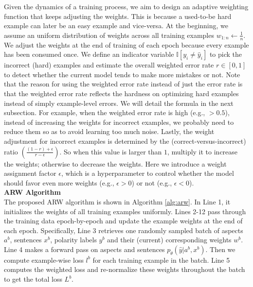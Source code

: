 Given the dynamics of a training process, we aim to design an adaptive weighting function that keeps adjusting the weights.
This is because a used-to-be hard example can later be an easy example and vice-versa.
At the beginning, we assume an uniform distribution of weights across all training examples $w_{1:n} \gets \frac{1}{n} $.
We adjust the weights at the end of training of each epoch because every example has been consumed once.
We define an indicator variable $\mathbb{I}[y_{i} \neq \hat{y}_{i}]$ to pick the incorrect (hard) examples and estimate the overall weighted error rate $r \in [0, 1]$ to detect whether the current model tends to make more mistakes or not. 
Note that the reason for using the weighted error rate instead of just the error rate is that the weighted error rate reflects the hardness on optimizing hard examples instead of simply example-level errors. We will detail the formula in the next subsection.
For example, when the weighted error rate is high (e.g., $>0.5$), instead of increasing the weights for incorrect examples, we probably need to reduce them so as to avoid learning too much noise.
Lastly, the weight adjustment for incorrect examples is determined by the (correct-versus-incorrect) ratio $(\frac{(1-r)+\epsilon}{r-\epsilon})$. So when this value is larger than $1$, multiply it to increase the weights; otherwise to decrease the weights.
Here we introduce a weight assignment factor $\epsilon$, which is a hyperparameter to control whether the model should favor even more weights (e.g., $\epsilon>0$) or not (e.g., $\epsilon<0$).\\
\textbf{ARW Algorithm}\\
The proposed ARW algorithm is shown in Algorithm \ref{alg:arw}.
In Line 1, it initializes the weights of all training examples uniformly.
Lines 2-12 pass through the training data epoch-by-epoch and update the example weights at the end of each epoch.
Specifically, Line 3 retrieves one randomly sampled batch of aspects $a^b$, sentences $x^b$, polarity labels $y^b$ and their (current) corresponding weights $w^b$.
Line 4 makes a forward pass on aspects and sentences $p_\theta(\hat{y}|a^b, x^b)$. Then we compute example-wise loss $l^b$ for each training example in the batch.
Line 5 computes the weighted loss and re-normalize these weights throughout the batch to get the total loss $L^b$. 
